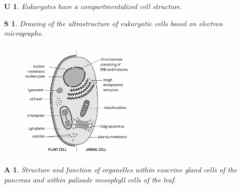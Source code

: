 \documentclass[12pt, a4paper]{article}
\newtheorem{und}{U}[subsection]
\newtheorem{skl}{S}[subsection]
\newtheorem{app}{A}[subsection]
\begin{document}
\begin{und}
    Eukaryotes have a compartmentalized cell structure. 
\end{und}
\begin{skl}
    Drawing of the ultrastructure of eukaryotic cells based on electron micrographs.
\end{skl}
\begin{figure}[H]
    \center
    \includegraphics[width=0.5\textwidth]{fig1.3.png}
\end{figure}
\begin{app}
    Structure and function of organelles within exocrine gland cells of the pancreas and within palisade mesophyll cells of the leaf.
\end{app} 
\end{document}
